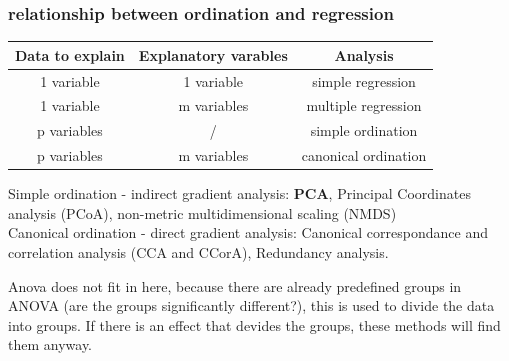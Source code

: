 \documentclass{article}
\begin{document}
\subsubsection{relationship between ordination and regression}
\renewcommand{\arraystretch}{1.5}
\begin{table}[h]
    \centering
    \begin{tabular}{c|c|c}
         \textbf{Data to explain} & \textbf{Explanatory varables} & \textbf{Analysis} \\
         \hline 
         1 variable & 1 variable & simple regression \\
         \hline
         1 variable & m variables & multiple regression \\
         \hline
         p variables & / & simple ordination \\
         \hline 
         p variables & m variables & canonical ordination 
    \end{tabular}
\end{table}
\renewcommand{\arraystretch}{1}

Simple ordination - indirect gradient analysis: \textbf{PCA}, Principal Coordinates analysis (PCoA), non-metric multidimensional scaling (NMDS)\\
Canonical ordination - direct gradient analysis: Canonical correspondance and correlation analysis (CCA and CCorA), Redundancy analysis.\par 
Anova does not fit in here, because there are already predefined groups in ANOVA (are the groups significantly different?), this is used to divide the data into groups. If there is an effect that devides the groups, these methods will find them anyway. 
\end{document}

